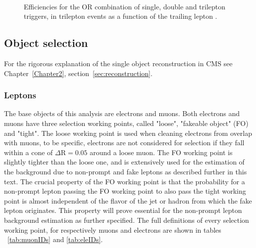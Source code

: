 \begin{figure}[h]
{  }\\
  \caption{Efficiencies for the OR combination of single, double and trilepton triggers, in trilepton events as a function
  of the trailing lepton \pt.}
  \label{fig:3l1l1lEff}
\end{figure}

\vspace{2cm}
\subsection{Object selection}\label{sec:object}
For the rigorous explanation of the single object reconstruction in
CMS see Chapter~\ref{Chapter2}, section~\ref{sec:reconstruction}.

\subsubsection{Leptons}
The base objects of this analysis are electrons and muons. Both electrons and muons have three selection working points, called "loose", "fakeable object" (FO) and "tight". The loose working point is used when cleaning electrons from overlap with muons, to be specific, electrons are not considered for selection if they fall within a cone of $\Delta \mathrm{R} = 0.05$ around a loose muon. The FO working point is slightly tighter than the loose one, and is extensively used for the estimation of the background due to non-prompt and fake leptons as described further in this text. The crucial property of the FO working point is that the probability for a non-prompt lepton passing the FO working point to also pass the tight working point is almost independent of the flavor of the jet or hadron from which the fake lepton originates. This property will prove essential for the non-prompt lepton background estimation as further specified. The full definitions of every selection working point, for respectively muons and electrons are shown in tables ~\ref{tab:muonIDs} and \ref{tab:eleIDs}.

